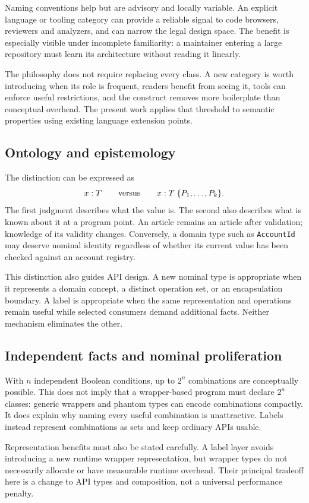 \documentclass[11pt]{article}
\begin{document}
Naming conventions help but are advisory and locally variable. An explicit
language or tooling category can provide a reliable signal to code browsers,
reviewers and analyzers, and can narrow the legal design space. The benefit
is especially visible under incomplete familiarity: a maintainer entering
a large repository must learn its architecture without reading it linearly.

The philosophy does not require replacing every class. A new category is
worth introducing when its role is frequent, readers benefit from seeing it,
tools can enforce useful restrictions, and the construct removes more
boilerplate than conceptual overhead. The present work applies that threshold
to semantic properties using existing language extension points.

\subsection{Ontology and epistemology}
The distinction can be expressed as
\[
 x:T \qquad\hbox{versus}\qquad x:T\;\{P_1,\ldots,P_k\}.
\]
The first judgment describes what the value is. The second also describes
what is known about it at a program point. An article remains an article
after validation; knowledge of its validity changes. Conversely, a domain
type such as \texttt{AccountId} may deserve nominal identity regardless of
whether its current value has been checked against an account registry.

This distinction also guides API design. A new nominal type is appropriate
when it represents a domain concept, a distinct operation set, or an
encapsulation boundary. A label is appropriate when the same representation
and operations remain useful while selected consumers demand additional
facts. Neither mechanism eliminates the other.

\subsection{Independent facts and nominal proliferation}
With $n$ independent Boolean conditions, up to $2^n$ combinations are
conceptually possible. This does not imply that a wrapper-based program must
declare $2^n$ classes: generic wrappers and phantom types can encode combinations
compactly. It does explain why naming every useful combination is unattractive.
Labels instead represent combinations as sets and keep ordinary APIs usable.

Representation benefits must also be stated carefully. A label layer avoids
introducing a new runtime wrapper representation, but wrapper types do not
necessarily allocate or have measurable runtime overhead. Their principal
tradeoff here is a change to API types and composition, not a universal
performance penalty.
\end{document}
